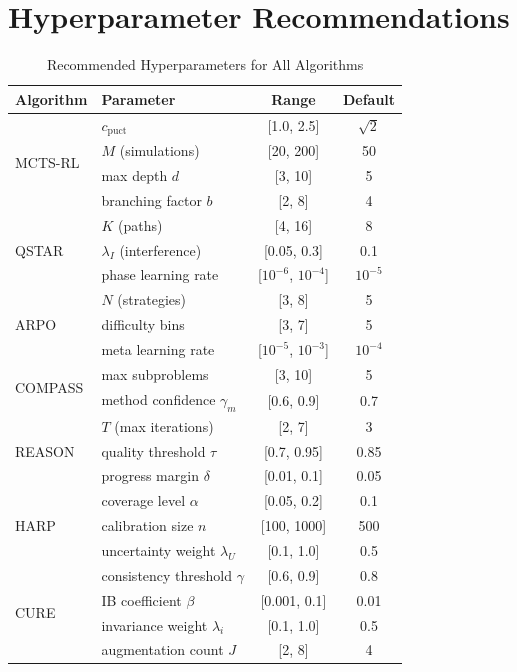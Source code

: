 \documentclass[11pt,a4paper]{article}
\begin{document}
\section{Hyperparameter Recommendations}

\begin{table}[H]
\centering
\caption{Recommended Hyperparameters for All Algorithms}
\begin{tabular}{llcc}
\toprule
\textbf{Algorithm} & \textbf{Parameter} & \textbf{Range} & \textbf{Default} \\
\midrule
\multirow{4}{*}{MCTS-RL} & $c_{\text{puct}}$ & [1.0, 2.5] & $\sqrt{2}$ \\
& $M$ (simulations) & [20, 200] & 50 \\
& max depth $d$ & [3, 10] & 5 \\
& branching factor $b$ & [2, 8] & 4 \\
\midrule
\multirow{3}{*}{QSTAR} & $K$ (paths) & [4, 16] & 8 \\
& $\lambda_I$ (interference) & [0.05, 0.3] & 0.1 \\
& phase learning rate & [$10^{-6}$, $10^{-4}$] & $10^{-5}$ \\
\midrule
\multirow{3}{*}{ARPO} & $N$ (strategies) & [3, 8] & 5 \\
& difficulty bins & [3, 7] & 5 \\
& meta learning rate & [$10^{-5}$, $10^{-3}$] & $10^{-4}$ \\
\midrule
\multirow{2}{*}{COMPASS} & max subproblems & [3, 10] & 5 \\
& method confidence $\gamma_m$ & [0.6, 0.9] & 0.7 \\
\midrule
\multirow{3}{*}{REASON} & $T$ (max iterations) & [2, 7] & 3 \\
& quality threshold $\tau$ & [0.7, 0.95] & 0.85 \\
& progress margin $\delta$ & [0.01, 0.1] & 0.05 \\
\midrule
\multirow{3}{*}{HARP} & coverage level $\alpha$ & [0.05, 0.2] & 0.1 \\
& calibration size $n$ & [100, 1000] & 500 \\
& uncertainty weight $\lambda_U$ & [0.1, 1.0] & 0.5 \\
\midrule
\multirow{4}{*}{CURE} & consistency threshold $\gamma$ & [0.6, 0.9] & 0.8 \\
& IB coefficient $\beta$ & [0.001, 0.1] & 0.01 \\
& invariance weight $\lambda_i$ & [0.1, 1.0] & 0.5 \\
& augmentation count $J$ & [2, 8] & 4 \\
\bottomrule
\end{tabular}
\end{table}
\end{document}
